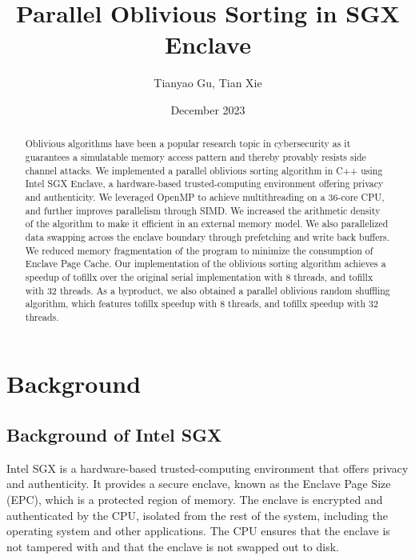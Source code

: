 \documentclass{article}
\title{Parallel Oblivious Sorting in SGX Enclave}
\author{Tianyao Gu, Tian Xie}
\date{December 2023}
\begin{document}
\maketitle

\begin{abstract}
    Oblivious algorithms have been a popular research topic in cybersecurity as it guarantees a simulatable memory access pattern and thereby provably resists side channel attacks. We implemented a parallel oblivious sorting algorithm in C++ using Intel SGX Enclave, a hardware-based trusted-computing environment offering privacy and authenticity. We leveraged OpenMP to achieve multithreading on a 36-core CPU, and further improves parallelism through SIMD. We increased the arithmetic density of the algorithm to make it efficient in an external memory model. We also parallelized data swapping across the enclave boundary through prefetching and write back buffers. We reduced memory fragmentation of the program to minimize the consumption of Enclave Page Cache. Our implementation of the oblivious sorting algorithm achieves a speedup of {\color{blue} tofill}x over the original serial implementation with 8 threads, and {\color{blue} tofill}x with 32 threads. As a byproduct, we also obtained a parallel oblivious random shuffling algorithm, which features {\color{blue} tofill}x speedup with 8 threads, and {\color{blue} tofill}x speedup with 32 threads.
\end{abstract}

\section{Background}
\subsection{Background of Intel SGX}
Intel SGX is a hardware-based trusted-computing environment that offers privacy and authenticity. It provides a secure enclave, known as the Enclave Page Size (EPC), which is a protected region of memory. The enclave is encrypted and authenticated by the CPU, isolated from the rest of the system, including the operating system and other applications. The CPU ensures that the enclave is not tampered with and that the enclave is not swapped out to disk. 
\end{document}
